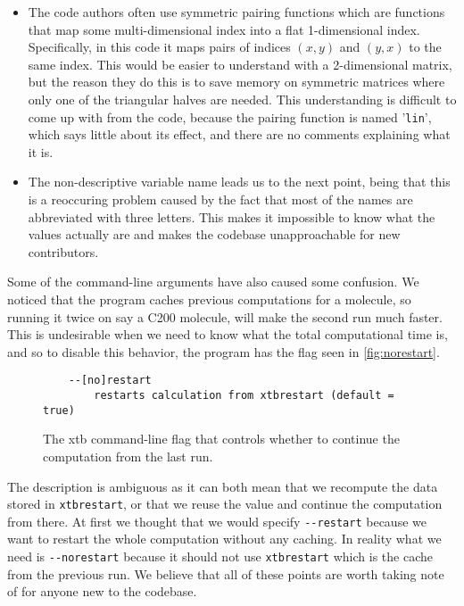 \begin{itemize}
        \item The code authors often use symmetric pairing functions which are functions that map some multi-dimensional index into a flat 1-dimensional index. Specifically, in this code it maps pairs of indices $(x,y)$ and $(y,x)$ to the same index. This would be easier to understand with a 2-dimensional matrix, but the reason they do this is to save memory on symmetric matrices where only one of the triangular halves are needed. This understanding is difficult to come up with from the code, because the pairing function is named '\verb|lin|', which says little about its effect, and there are no comments explaining what it is.
        \item The non-descriptive variable name leads us to the next point, being that this is a reoccuring problem caused by the fact that most of the names are abbreviated with three letters. This makes it impossible to know what the values actually are and makes the codebase unapproachable for new contributors.
\end{itemize}

Some of the command-line arguments have also caused some confusion. We noticed that the program caches previous computations for a molecule, so running it twice on say a C200 molecule, will make the second run much faster. This is undesirable when we need to know what the total computational time is, and so to disable this behavior, the program has the flag seen in \autoref{fig:norestart}.
\begin{figure}[H]
\begin{verbatim}
    --[no]restart
        restarts calculation from xtbrestart (default = true)
\end{verbatim}
\caption{The xtb command-line flag that controls whether to continue the computation from the last run.}
\label{fig:norestart}
\end{figure}

The description is ambiguous as it can both mean that we recompute the data stored in \verb|xtbrestart|, or that we reuse the value and continue the computation from there. At first we thought that we would specify \verb|--restart| because we want to restart the whole computation without any caching. In reality what we need is \verb|--norestart| because it should not use \verb|xtbrestart| which is the cache from the previous run. We believe that all of these points are worth taking note of for anyone new to the codebase.

